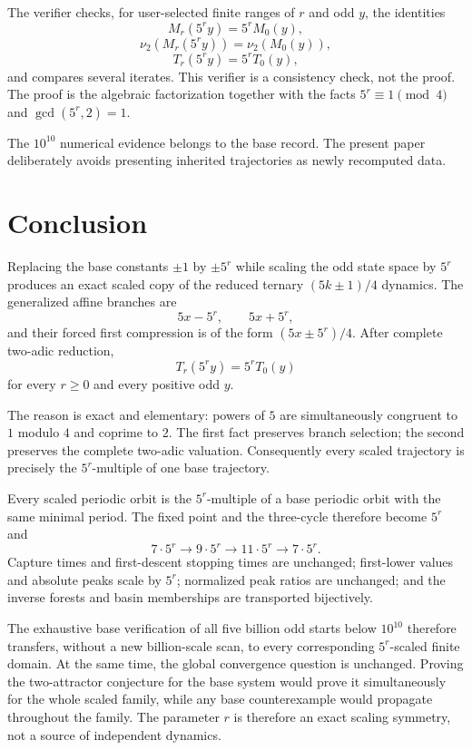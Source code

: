 \documentclass[11pt]{article}
\theoremstyle{remark}
\newcommand{\vTwo}{\nu_2}
\begin{document}
The verifier checks, for user-selected finite ranges of $r$ and odd $y$, the identities
\[
M_r(5^ry)=5^rM_0(y),
\]
\[
\vTwo(M_r(5^ry))=\vTwo(M_0(y)),
\]
\[
T_r(5^ry)=5^rT_0(y),
\]
and compares several iterates.  This verifier is a consistency check, not the proof.  The proof is the algebraic factorization together with the facts $5^r\equiv1\pmod4$ and $\gcd(5^r,2)=1$.

The $10^{10}$ numerical evidence belongs to the base record.  The present paper deliberately avoids presenting inherited trajectories as newly recomputed data.

\section{Conclusion}

Replacing the base constants $\pm1$ by $\pm5^r$ while scaling the odd state space by $5^r$ produces an exact scaled copy of the reduced ternary $(5k\pm1)/4$ dynamics.  The generalized affine branches are
\[
5x-5^r,\qquad 5x+5^r,
\]
and their forced first compression is of the form $(5x\pm5^r)/4$.  After complete two-adic reduction,
\[
T_r(5^ry)=5^rT_0(y)
\]
for every $r\ge0$ and every positive odd $y$.

The reason is exact and elementary: powers of $5$ are simultaneously congruent to $1$ modulo $4$ and coprime to $2$.  The first fact preserves branch selection; the second preserves the complete two-adic valuation.  Consequently every scaled trajectory is precisely the $5^r$-multiple of one base trajectory.

Every scaled periodic orbit is the $5^r$-multiple of a base periodic orbit with the same minimal period.  The fixed point and the three-cycle therefore become $5^r$ and
\[
7\cdot5^r\to9\cdot5^r\to11\cdot5^r\to7\cdot5^r.
\]
Capture times and first-descent stopping times are unchanged; first-lower values and absolute peaks scale by $5^r$; normalized peak ratios are unchanged; and the inverse forests and basin memberships are transported bijectively.

The exhaustive base verification of all five billion odd starts below $10^{10}$ therefore transfers, without a new billion-scale scan, to every corresponding $5^r$-scaled finite domain.  At the same time, the global convergence question is unchanged.  Proving the two-attractor conjecture for the base system would prove it simultaneously for the whole scaled family, while any base counterexample would propagate throughout the family.  The parameter $r$ is therefore an exact scaling symmetry, not a source of independent dynamics.
\end{document}
